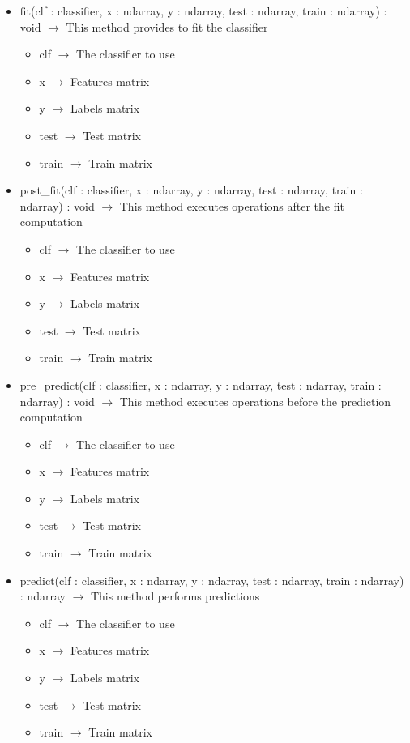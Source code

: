 \begin{description}
\begin{itemize}
\item fit(clf : classifier, x : ndarray, y : ndarray, test : ndarray, train : ndarray) : void $\rightarrow$ This method provides to fit the classifier\begin{itemize}
\item clf $\rightarrow$ The classifier to use
\item x $\rightarrow$ Features matrix
\item y $\rightarrow$ Labels matrix
\item test $\rightarrow$ Test matrix
\item train $\rightarrow$ Train matrix
\end{itemize}

\item post\_fit(clf : classifier, x : ndarray, y : ndarray, test : ndarray, train : ndarray) : void $\rightarrow$ This method executes operations after the fit computation\begin{itemize}
\item clf $\rightarrow$ The classifier to use
\item x $\rightarrow$ Features matrix
\item y $\rightarrow$ Labels matrix
\item test $\rightarrow$ Test matrix
\item train $\rightarrow$ Train matrix
\end{itemize}

\item pre\_predict(clf : classifier, x : ndarray, y : ndarray, test : ndarray, train : ndarray) : void $\rightarrow$ This method executes operations before the prediction computation\begin{itemize}
\item clf $\rightarrow$ The classifier to use
\item x $\rightarrow$ Features matrix
\item y $\rightarrow$ Labels matrix
\item test $\rightarrow$ Test matrix
\item train $\rightarrow$ Train matrix
\end{itemize}

\item predict(clf : classifier, x : ndarray, y : ndarray, test : ndarray, train : ndarray) : ndarray $\rightarrow$ This method performs predictions\begin{itemize}
\item clf $\rightarrow$ The classifier to use
\item x $\rightarrow$ Features matrix
\item y $\rightarrow$ Labels matrix
\item test $\rightarrow$ Test matrix
\item train $\rightarrow$ Train matrix
\end{itemize}


\end{itemize}
\end{description}
